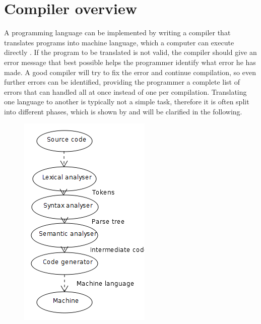 \section{Compiler overview}

A programming language can be implemented by writing a compiler that translates programs into machine language, which a computer can execute directly \cite[p. 44]{sebesta2013}.
If the program to be translated is not valid, the compiler should give an error message that best possible helps the programmer identify what error he has made. A good compiler will try to fix the error and continue compilation, so even further errors can be identified, providing the programmer a complete list of errors that can handled all at once instead of one per compilation. Translating one language to another is typically not a simple task, therefore it is often split into different phases, which is shown by  and will be clarified in the following.

\begin{figure}
\centering
\includegraphics[scale=0.5]{pictures/compileroverview.png}
\label{fig:compileroverviewphases}
\end{figure}

